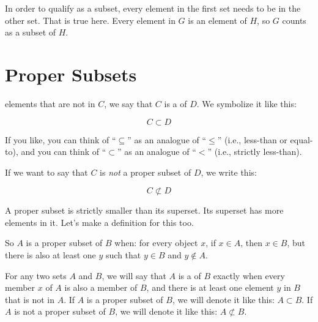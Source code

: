 \documentclass[../../../main.tex]{subfiles}
\begin{document}
In order to qualify as a subset, every element in the first set needs to be in the other set. That is true here. Every element in $G$ is an element of $H$, so $G$ counts as a subset of $H$.


\section{Proper Subsets}

 elements that are not in $C$, we say that $C$ is a  of $D$. We symbolize it like this:

\begin{equation*}
  C \subset D
\end{equation*}

\begin{aside}
  \begin{remark}
  If you like, you can think of ``$\subseteq$'' as an analogue of ``$\leq$'' (i.e., less-than or equal-to), and you can think of ``$\subset$'' as an analogue of ``$<$'' (i.e., strictly less-than).
  \end{remark}
\end{aside}

If we want to say that $C$ is \emph{not} a proper subset of $D$, we write this:

\begin{equation*}
  C \not \subset D
\end{equation*}

A proper subset is strictly smaller than its superset. Its superset has more elements in it. Let's make a definition for this too.

\begin{aside}
  \begin{remark}
    So $A$ is a proper subset of $B$ when: for every object $x$, if $x \in A$, then $x \in B$, but there is also at least one $y$ such that $y \in B$ and $y \not \in A$. 
  \end{remark}
\end{aside}

\begin{fdefinition}
  \label{def:proper-subset}
  For any two sets $A$ and $B$, we will say that $A$ is a  of $B$ exactly when every member $x$ of $A$ is also a member of $B$, and there is at least one element $y$ in $B$ that is not in $A$. If $A$ is a proper subset of $B$, we will denote it like this: $A \subset B$. If $A$ is not a proper subset of $B$, we will denote it like this: $A \not \subset B$.
\end{fdefinition}
\end{document}

